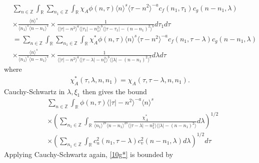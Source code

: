 \documentclass[12pt,reqno]{amsart}
\numberwithin{equation}{section}  %
\numberwithin{figure}{section}
\newcommand{\rr}{\mathbb{R}}
\newcommand{\zz}{\mathbb{Z}}
\theoremstyle{plain}
\theoremstyle{definition}
\theoremstyle{remark}
\begin{document}
\begin{equation*}
	\begin{split}
    & \sum_{n \in \zz} \int_{\rr}   \sum_{n_1 \in \zz}
    \int_{\rr} \chi_{A}
    \phi(n, \tau) \langle n \rangle^s \langle \tau - n^{2} \rangle^{-a}
  c_f(n_1, \tau_1)
		c_g(n - n_1, \lambda )
		\\
    & \times \frac{\langle n \rangle ^{s}}{\langle n_{1} \rangle ^{s} \langle
    n-n_{1} \rangle ^{s}} \times \frac{1}{\langle |\tau| - n^{2} \rangle
    ^{a}\langle |\tau_{1}|-n_{1}^{2} \rangle ^{b}\langle | \tau -
    \tau_{1}|-(n - n_{1})^{2}
    \rangle ^{b}} d \tau_1 d \tau
    \\
    & = \sum_{n \in \zz} \int_{\rr}   \sum_{n_1 \in \zz}
    \int_{\rr} \chi^{*}_{A}
    \phi(n, \tau) \langle n \rangle^s \langle \tau - n^{2} \rangle^{-a}
  c_f(n_1, \tau - \lambda)
		c_g(n - n_1, \lambda )
		\\
    & \times \frac{\langle n \rangle ^{s}}{\langle n_{1} \rangle ^{s} \langle
    n-n_{1} \rangle ^{s}} \times \frac{1}{\langle |\tau| - n^{2} \rangle
    ^{a}\langle |\tau - \lambda|-n_{1}^{2} \rangle ^{b}\langle |
    \lambda|-(n - n_{1})^{2}
    \rangle ^{b}} d \lambda  d \tau
	\end{split}
\end{equation*}
where 
%
%
\begin{equation}
  \label{change-of-var}
\begin{split}
  \chi^{*}_{A}(\tau, \lambda, n, n_{1}) =
  \chi_{A}(\tau, \tau - \lambda, n, n_{1}).
\end{split}
\end{equation}
%
%
Cauchy-Schwartz in
$\lambda, \xi_{1}$ then gives the bound
%
%
%
\begin{equation}
	\label{10g*}
	\begin{split}
    & \sum_{n \in \zz} \int_{\rr} \phi(n, \tau) \langle | \tau | - n^{2} \rangle
    ^{-a} \langle n \rangle ^{s}
    \\
    & \times \left( \sum_{n_{1} \in \zz} \int_{\rr}
    \frac{\chi^{*}_{A}}{\langle n_{1} \rangle ^{2s} \langle n-n_{1} \rangle ^{2s} \langle |
    \tau - \lambda | - n_{1}^{2}\rangle  \langle | \lambda | -
    (n - n_{1})^{2} \rangle } d \lambda \right)^{1/2}
    \\
    & \times \left( \sum_{n_{1} \in \zz} \int_{\rr} c_{u}^{2}(n_{1}, \tau - \lambda)
    c_{v}^{2}(n - n_{1}, \lambda) d \lambda \right)^{1/2} d \tau
  \end{split}
\end{equation}
%
%
Applying Cauchy-Schwartz again, \eqref{10g*} is bounded by
\end{document}
